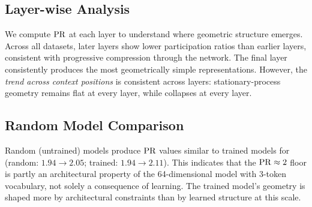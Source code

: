 \begin{table}[t]
\caption{Pre-registered hypothesis outcomes. We evaluate each hypothesis against the experimental evidence, reporting the key statistical test and our assessment.}
\label{tab:hypotheses}
\centering
{}
\end{table}

\subsection{Layer-wise Analysis}
\label{sec:layers}

We compute $\mathrm{PR}$ at each layer to understand where geometric structure emerges. Across all datasets, later layers show lower participation ratios than earlier layers, consistent with progressive compression through the network. The final layer consistently produces the most geometrically simple representations. However, the \emph{trend across context positions} is consistent across layers: stationary-process geometry remains flat at every layer, while \ttt collapses at every layer.

\subsection{Random Model Comparison}
\label{sec:random_baseline}

Random (untrained) models produce $\mathrm{PR}$ values similar to trained models for \messthree (random: $1.94 \to 2.05$; trained: $1.94 \to 2.11$). This indicates that the $\mathrm{PR} \approx 2$ floor is partly an architectural property of the 64-dimensional model with 3-token vocabulary, not solely a consequence of learning. The trained model's geometry is shaped more by architectural constraints than by learned structure at this scale.
